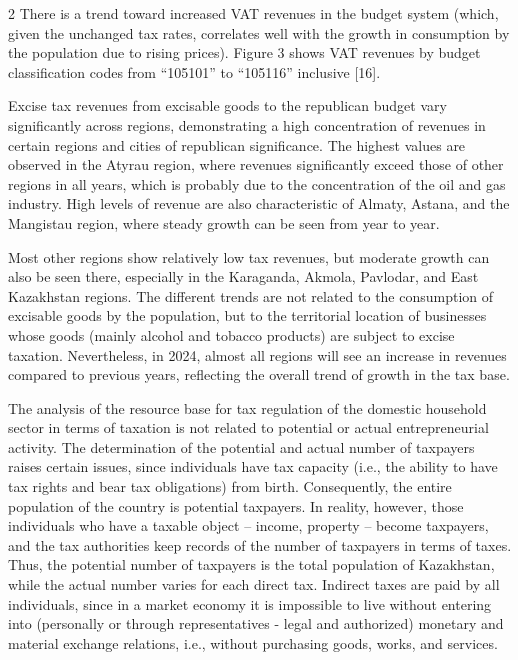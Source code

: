 \begin{multicols}{2}
There is a trend toward increased VAT revenues in the budget system
(which, given the unchanged tax rates, correlates well with the growth
in consumption by the population due to rising prices). Figure 3 shows
VAT revenues by budget classification codes from ``105101'' to
``105116'' inclusive {[}16{]}.

Excise tax revenues from excisable goods to the republican budget vary
significantly across regions, demonstrating a high concentration of
revenues in certain regions and cities of republican significance. The
highest values are observed in the Atyrau region, where revenues
significantly exceed those of other regions in all years, which is
probably due to the concentration of the oil and gas industry. High
levels of revenue are also characteristic of Almaty, Astana, and the
Mangistau region, where steady growth can be seen from year to year.

Most other regions show relatively low tax revenues, but moderate growth
can also be seen there, especially in the Karaganda, Akmola, Pavlodar,
and East Kazakhstan regions. The different trends are not related to the
consumption of excisable goods by the population, but to the territorial
location of businesses whose goods (mainly alcohol and tobacco products)
are subject to excise taxation. Nevertheless, in 2024, almost all
regions will see an increase in revenues compared to previous years,
reflecting the overall trend of growth in the tax base.

The analysis of the resource base for tax regulation of the domestic
household sector in terms of taxation is not related to potential or
actual entrepreneurial activity. The determination of the potential and
actual number of taxpayers raises certain issues, since individuals have
tax capacity (i.e., the ability to have tax rights and bear tax
obligations) from birth. Consequently, the entire population of the
country is potential taxpayers. In reality, however, those individuals
who have a taxable object -- income, property -- become taxpayers, and
the tax authorities keep records of the number of taxpayers in terms of
taxes. Thus, the potential number of taxpayers is the total population
of Kazakhstan, while the actual number varies for each direct tax.
Indirect taxes are paid by all individuals, since in a market economy it
is impossible to live without entering into (personally or through
representatives - legal and authorized) monetary and material exchange
relations, i.e., without purchasing goods, works, and services.


\end{multicols}
